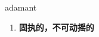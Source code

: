 
\begin{frame}
{\huge adamant}
\begin{center}
\begin{enumerate}\Large
  \item \textbf{固执的，不可动摇的}
\end{enumerate}
\end{center}
\end{frame}
